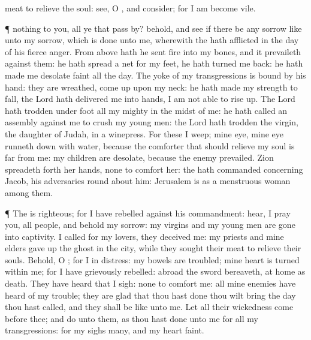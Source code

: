 {meat to
relieve the
soul:
see, O
{}, and
consider; for I am become
vile.
\par }{\PP {}¶
{} nothing to you, all ye that
pass
by?
behold, and
see if there
be any
sorrow like unto my
sorrow, which is
done unto me, wherewith the
{} hath
afflicted
{} in the
day of his
fierce
anger.
From
above hath he
sent
fire into my
bones, and it
prevaileth against them: he hath
spread a
net for my
feet, he hath
turned me
back: he hath
made me
desolate
{}
faint all the
day.
The
yoke of my
transgressions is
bound by his
hand: they are
wreathed,
{} come
up upon my
neck: he hath made my
strength to
fall, the
Lord hath
delivered me into
{}
hands,
{} I am not
able to rise
up.
The
Lord hath trodden under
foot all my
mighty
{} in the
midst of me: he hath
called an
assembly against me to
crush my young
men: the
Lord hath
trodden the
virgin, the
daughter of
Judah,
{} in a
winepress.
For these
{} I
weep; mine
eye, mine
eye runneth
down with
water, because the
comforter that should
relieve my
soul is
far from me: my
children are
desolate, because the
enemy
prevailed.
Zion spreadeth
forth her
hands,
{} none to
comfort her: the
{} hath
commanded concerning
Jacob,
{} his
adversaries
{} round
about him:
Jerusalem is as a menstruous
woman among them.
\par }{\PP {}¶ The
{} is
righteous; for I have
rebelled against his
commandment:
hear, I pray you, all
people, and
behold my
sorrow: my
virgins and my young
men are
gone into
captivity.
I
called for my
lovers,
{} they
deceived me: my
priests and mine
elders gave up the
ghost in the
city, while they
sought their
meat to
relieve their
souls.
Behold, O
{}; for I
{} in
distress: my
bowels are
troubled; mine
heart is
turned
within me; for I have
grievously
rebelled:
abroad the
sword
bereaveth, at
home
{} as
death.
They have
heard that I
sigh:
{} none to
comfort me: all mine
enemies have
heard of my
trouble; they are
glad that thou hast
done
{} thou wilt
bring the
day
{} thou hast
called, and they shall be
like unto me.
Let all their
wickedness
come
before thee; and
do unto them, as thou hast
done unto me for all my
transgressions: for my
sighs
{}
many, and my
heart
{}
faint.

}
